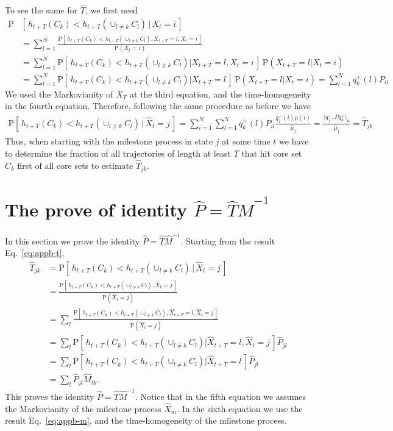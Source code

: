 \documentclass[aps, pre, preprint,unsortedaddress,a4paper,onecolumn]{revtex4}
\newcommand{\fwd}[0]{+}
\newcommand{\bwd}[0]{-}
\newcommand{\prob}{\textrm{P}}
\begin{document}
To see the same for $\hat{T}$, we first need
\begin{align*}
  \prob & [\,h_{t+T}(C_k) < h_{t+T}(\cup_{l\neq k} C_l) \,\vert\, X_t = i\,]\\
  &=
  \sum_{l=1}^N
  \frac{\prob [\,h_{t+T}(C_k) < h_{t+T}(\cup_{l\neq k} C_l), X_{t+T} = l, X_t = i\,]}
  {\prob (X_t = i)} \\
  &=
  \sum_{l=1}^N
  {\prob [\,h_{t+T}(C_k) < h_{t+T}(\cup_{l\neq k} C_l) \vert X_{t+T} = l, X_t = i\,]}\,
  {\prob( X_{t+T} = l \vert X_t = i)}\\
  & =
  \sum_{l=1}^N
  {\prob [\,h_{t+T}(C_k) < h_{t+T}(\cup_{l\neq k} C_l) \vert X_{t+T} = l\,]}\,
  {\prob( X_{t+T} = l \vert X_t = i)}  = \sum_{l=1}^N
  q^\fwd_k(l) P_{il}
\end{align*}
We used the Markovianity of $X_T$ at the third equation,
and the time-homogeneity in the fourth equation.
Therefore, following the same procedure as before we have
\begin{align}\label{eq:appb-t}
  \prob [\,h_{t+T}(C_k) < h_{t+T}(\cup_{l\neq k} C_l) \,\vert\, \hat X_t = j\,]=
  \sum_{i=1}^N\sum_{l=1}^N
  q^\fwd_k(l) P_{il}
  \frac{q^\bwd_j(i) \mu(i)}{\hat \mu_j} = \frac{\langle q_j^\bwd, P q_k^\fwd\rangle_\mu}{\hat \mu_j}  = {\hat T}_{jk}
\end{align}
Thus, when starting with the milestone process in state $j$ at some time $t$ we have to determine the fraction of all trajectories of length at least $T$ that hit core set $C_k$ first of all core sets to estimate $\hat{T}_{jk}$.

\section{The prove of identity $\hat P = \hat T\hat M^{-1}$}
\label{sec:app-ptm}
In this section we prove the identity  $\hat P = \hat T\hat M^{-1}$. Starting from the
result Eq.~\eqref{eq:appb-t},
\begin{align*}
  \hat T_{jk} &=
  \prob [\,h_{t+T}(C_k) < h_{t+T}(\cup_{l\neq k} C_l) \,\vert\, \hat X_t = j\,]\\
  &=
  \frac{\prob [\,h_{t+T}(C_k) < h_{t+T}(\cup_{l\neq k} C_l), \hat X_t = j\,] }{\prob(\hat X_t = j)}\\
  & =
  \sum_l \frac{\prob [\,h_{t+T}(C_k) < h_{t+T}(\cup_{l\neq k} C_l), \hat X_{t+T} = l, \hat X_t = j\,] }{\prob(\hat X_t = j)}\\
  & =
  \sum_l \prob [\,h_{t+T}(C_k) < h_{t+T}(\cup_{l\neq k} C_l)\vert \hat X_{t+T} = l, \hat X_t = j\,] \hat P_{jl}\\  
  & =
  \sum_l \prob [\,h_{t+T}(C_k) < h_{t+T}(\cup_{l\neq k} C_l)\vert \hat X_{t+T} = l\,] \hat P_{jl}\\
  &= 
  \sum_l  \hat P_{jl}\hat M_{lk}.
\end{align*}
This proves the identity $\hat P = \hat T\hat M^{-1}$.
Notice that in the fifth equation we assumes the Markovianity of the milestone process $\hat X_m$. In the sixth equation we use the result Eq.~\eqref{eq:appb-m}, and the time-homogeneity of the milestone process.


{}

\end{document}
